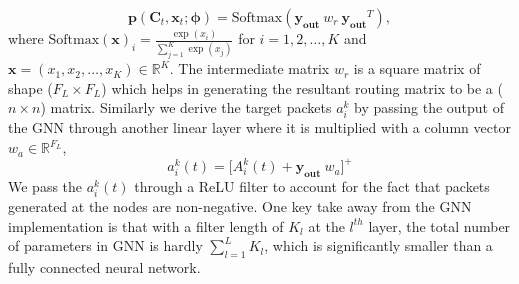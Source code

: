 \documentclass[lettersize,journal]{IEEEtran}
\begin{document}
\begin{equation} \label{p_softmax}
    \mathbf{p}(\mathbf{C}_t,\mathbf{x}_t;\bm{\phi}) = \text{Softmax} (\mathbf{y_{out}} ~ w_r ~ \mathbf{y_{out}}^T),
\end{equation}
where $\text{Softmax}(\mathbf{x})_i = \frac{\exp(x_i)}{\sum_{j=1}^{K}\exp(x_j)} $ for $i=1,2,\dots,K$ and $\mathbf{x}=(x_1,x_2,\dots,x_K) \in \mathbb{R}^K$. The intermediate matrix $w_r$ is a square matrix of shape ($F_L \times F_L$) which helps in generating the resultant routing matrix to be a ($n \times n$) matrix. %
Similarly we derive the target packets $a_i^k$ by passing the output of the GNN through another linear layer where it is multiplied with a column vector $w_a \in \mathbb{R}^{F_L}$,
\begin{equation} \label{a_ik}
    a_i^k(t) = \big[A_i^k(t) + \mathbf{y_{out}} ~ w_a \big]^+
\end{equation}
We pass the $a_i^k(t)$ through a ReLU filter to account for the fact that packets generated at the nodes are non-negative. 
One key take away from the GNN implementation is that with a filter length of $K_l$ at the $l^{th}$ layer, the total number of parameters in GNN is hardly $\sum_{l=1}^{L}K_l$, which is significantly smaller than a fully connected neural network.%
\end{document}
